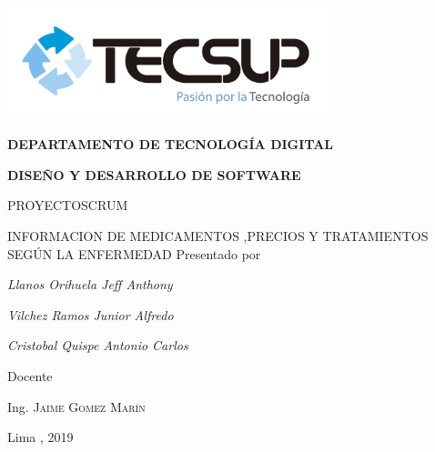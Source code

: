 \begin{titlepage}
	\centering
	\includegraphics[width=0.70\textwidth]{img/logo_tecsup_final}\par\vspace{1cm}
	\vspace{0.30cm}	
	{\scshape\large\bfseries DEPARTAMENTO DE TECNOLOG\'IA DIGITAL \par}
	\vspace{0.60cm}	
	{\scshape\large\bfseries DISEÑO Y DESARROLLO DE SOFTWARE  \par}
	\vspace{2.00cm}		
	{\large\large  PROYECTOSCRUM \par}
	\vspace{0.60cm}
	{\scshape\large INFORMACION DE MEDICAMENTOS ,PRECIOS Y TRATAMIENTOS SEGÚN LA ENFERMEDAD}
	\vspace{0.60cm}
	\vfill
	Presentado por \par
	{\large\itshape { Llanos Orihuela Jeff Anthony }\par}
	{\large\itshape { Vilchez Ramos Junior Alfredo}\par}
	{\large\itshape { Cristobal Quispe Antonio Carlos}\par}
	\vspace{0.30cm}
	\vfill
	Docente \par
	Ing.  \textsc{Jaime Gomez Marín}
	
  \vspace{0.30cm}
	\vfill
        {\large Lima , 2019 \par}
\end{titlepage}

